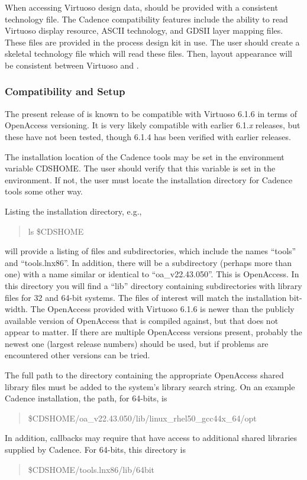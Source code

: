 When accessing Virtuoso design data, {\Xic} should be provided with a
consistent technology file.  The Cadence compatibility features
include the ability to read Virtuoso display resource, ASCII
technology, and GDSII layer mapping files.  These files are provided
in the process design kit in use.  The user should create a skeletal
{\Xic} technology file which will read these files.  Then, layout
appearance will be consistent between Virtuoso and {\Xic}.

\subsubsection{Compatibility and Setup}

The present release of {\Xic} is known to be compatible with Virtuoso
6.1.6 in terms of OpenAccess versioning.  It is very likely compatible
with earlier 6.1.{\it x} releases, but these have not been tested,
though 6.1.4 has been verified with earlier {\Xic} releases.

The installation location of the Cadence tools may be set in the
environment variable {\et CDSHOME}.  The user should verify that this
variable is set in the environment.  If not, the user must locate the
installation directory for Cadence tools some other way.

Listing the installation directory, e.g.,
\begin{quote}
{\vt ls \$CDSHOME}
\end{quote}
will provide a listing of files and subdirectories, which include the
names ``{\vt tools}'' and ``{\vt tools.lnx86}''.  In addition, there
will be a subdirectory (perhaps more than one) with a name similar or
identical to ``{\vt oa\_v22.43.050}''.  This is OpenAccess.  In this
directory you will find a ``{\vt lib}'' directory containing
subdirectories with library files for 32 and 64-bit systems.  The
files of interest will match the {\Xic} installation bit-width.  The
OpenAccess provided with Virtuoso 6.1.6 is newer than the publicly
available version of OpenAccess that {\Xic} is compiled against, but
that does not appear to matter.  If there are multiple OpenAccess
versions present, probably the newest one (largest release numbers)
should be used, but if problems are encountered other versions can be
tried.

The full path to the directory containing the appropriate
OpenAccess shared library files must be added to the system's
library search string.  On an example Cadence installation, the
path, for 64-bits, is
\begin{quote}
\vt \$CDSHOME/oa\_v22.43.050/lib/linux\_rhel50\_gcc44x\_64/opt
\end{quote}
In addition, callbacks may require that {\Xic} have access to
additional shared libraries supplied by Cadence.  For 64-bits,
this directory is
\begin{quote}
\vt \$CDSHOME/tools.lnx86/lib/64bit
\end{quote}

